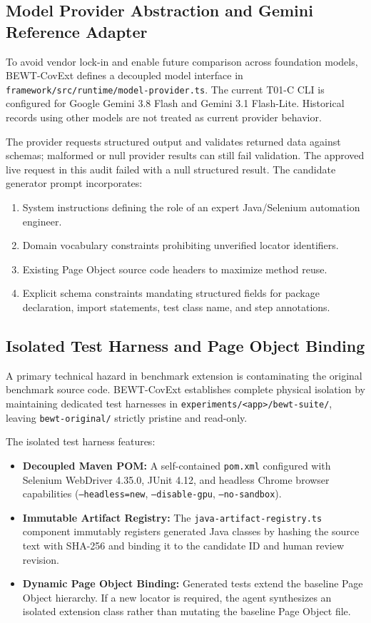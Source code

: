 \documentclass[pdflatex,sn-mathphys-num]{sn-jnl}
\begin{document}
\subsection{Model Provider Abstraction and Gemini Reference Adapter}

To avoid vendor lock-in and enable future comparison across foundation models, BEWT-CovExt defines a decoupled model interface in \texttt{framework/src/runtime/model-provider.ts}. The current T01-C CLI is configured for Google Gemini 3.8 Flash and Gemini 3.1 Flash-Lite. Historical records using other models are not treated as current provider behavior.

The provider requests structured output and validates returned data against schemas; malformed or null provider results can still fail validation. The approved live request in this audit failed with a null structured result. The candidate generator prompt incorporates:
\begin{enumerate}
    \item System instructions defining the role of an expert Java/Selenium automation engineer.
    \item Domain vocabulary constraints prohibiting unverified locator identifiers.
    \item Existing Page Object source code headers to maximize method reuse.
    \item Explicit schema constraints mandating structured fields for package declaration, import statements, test class name, and step annotations.
\end{enumerate}

\subsection{Isolated Test Harness and Page Object Binding}

A primary technical hazard in benchmark extension is contaminating the original benchmark source code. BEWT-CovExt establishes complete physical isolation by maintaining dedicated test harnesses in \texttt{experiments/<app>/bewt-suite/}, leaving \texttt{bewt-original/} strictly pristine and read-only.

The isolated test harness features:
\begin{itemize}
    \item \textbf{Decoupled Maven POM:} A self-contained \texttt{pom.xml} configured with Selenium WebDriver 4.35.0, JUnit 4.12, and headless Chrome browser capabilities (\texttt{--headless=new}, \texttt{--disable-gpu}, \texttt{--no-sandbox}).
    \item \textbf{Immutable Artifact Registry:} The \texttt{java-artifact-registry.ts} component immutably registers generated Java classes by hashing the source text with SHA-256 and binding it to the candidate ID and human review revision.
    \item \textbf{Dynamic Page Object Binding:} Generated tests extend the baseline Page Object hierarchy. If a new locator is required, the agent synthesizes an isolated extension class rather than mutating the baseline Page Object file.
\end{itemize}
\end{document}
